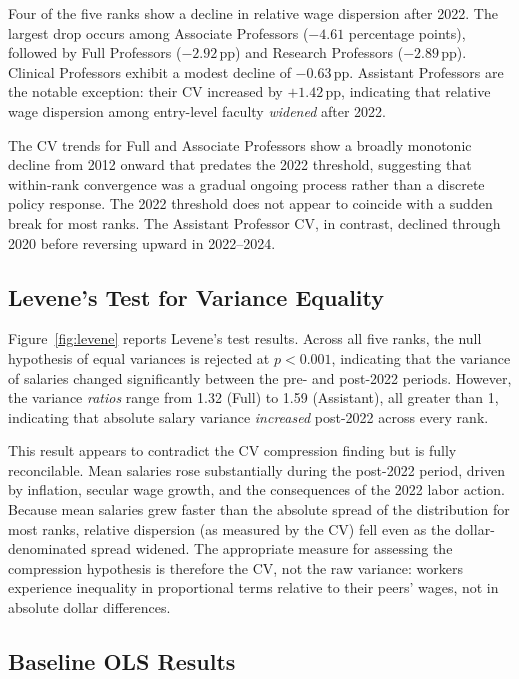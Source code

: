 \documentclass[12pt]{article}
\begin{document}
Four of the five ranks show a decline in relative wage dispersion after
2022. The largest drop occurs among Associate Professors
($-4.61$ percentage points), followed by Full Professors ($-2.92$\,pp)
and Research Professors ($-2.89$\,pp). Clinical Professors exhibit a
modest decline of $-0.63$\,pp. Assistant Professors are the notable
exception: their CV increased by $+1.42$\,pp, indicating that relative
wage dispersion among entry-level faculty \emph{widened} after 2022.

The CV trends for Full and Associate Professors show a broadly
monotonic decline from 2012 onward that predates the 2022 threshold,
suggesting that within-rank convergence was a gradual ongoing process
rather than a discrete policy response. The 2022 threshold does not
appear to coincide with a sudden break for most ranks. The Assistant
Professor CV, in contrast, declined through 2020 before reversing
upward in 2022--2024.

\subsection{Levene's Test for Variance Equality}
\label{subsec:levene}

Figure~\ref{fig:levene} reports Levene's test
results. Across all five ranks, the null hypothesis of equal variances
is rejected at $p < 0.001$, indicating that the variance of salaries
changed significantly between the pre- and post-2022 periods. However,
the variance \emph{ratios} range from 1.32 (Full) to 1.59 (Assistant),
all greater than 1, indicating that absolute salary variance
\emph{increased} post-2022 across every rank.

This result appears to contradict the CV compression finding but is
fully reconcilable. Mean salaries rose substantially during the
post-2022 period, driven by inflation, secular wage growth, and the
consequences of the 2022 labor action. Because mean salaries grew faster
than the absolute spread of the distribution for most ranks, relative
dispersion (as measured by the CV) fell even as the dollar-denominated
spread widened. The appropriate measure for assessing the compression
hypothesis is therefore the CV, not the raw variance: workers experience
inequality in proportional terms relative to their peers' wages, not in
absolute dollar differences.

\subsection{Baseline OLS Results}
\label{subsec:baseline}
\end{document}
